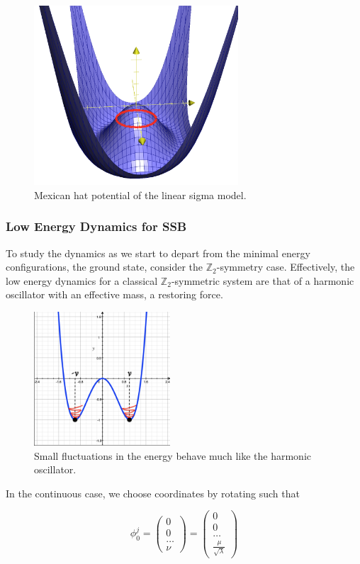 \begin{figure}[H]
	\centering
	\includegraphics[width=3in]{images/mexhat3d.png}
	\caption*{Mexican hat potential of the linear sigma model.}
\end{figure}

\subsubsection*{Low Energy Dynamics for SSB}

\noindent To study the dynamics as we start to depart from the minimal energy configurations, the ground state, consider the $\mathbb{Z}_2$-symmetry case. Effectively, the low energy dynamics for a classical $\mathbb{Z}_2$-symmetric system are that of a harmonic oscillator with an effective mass, a restoring force. \\

\begin{figure}[H]
	\centering
	\includegraphics[width=2in]{images/mexhat2d_smalldev.png}
	\caption*{Small fluctuations in the energy behave much like the harmonic oscillator.}
\end{figure}

\noindent In the continuous case, we choose coordinates by rotating such that

\begin{equation}
\phi_0^j = \begin{pmatrix} 0 \\ 0 \\ \dots \\ \nu \end{pmatrix} = \begin{pmatrix} 0 \\ 0 \\ \dots \\ \frac{\mu}{\sqrt{\lambda}} \end{pmatrix}
\end{equation}

